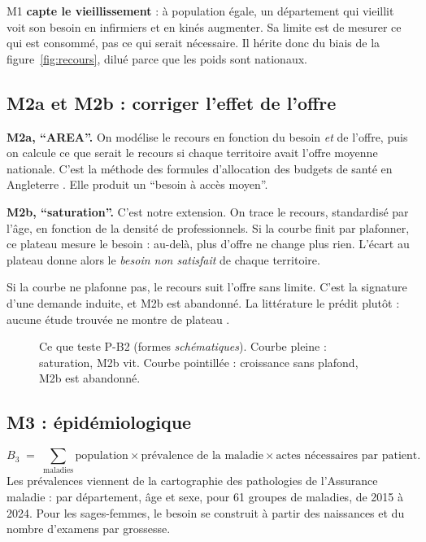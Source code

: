\documentclass[11pt]{article}
\begin{document}
M1 \textbf{capte le vieillissement} : à population égale, un département qui vieillit voit son besoin en infirmiers et
en kinés augmenter. Sa limite est de mesurer ce qui est consommé, pas ce qui serait nécessaire. Il hérite donc du
biais de la figure~\ref{fig:recours}, dilué parce que les poids sont nationaux.

\subsection*{M2a et M2b : corriger l'effet de l'offre}
\textbf{M2a, \enquote{AREA}.} On modélise le recours en fonction du besoin \emph{et} de l'offre, puis on calcule ce
que serait le recours si chaque territoire avait l'offre moyenne nationale. C'est la méthode des formules d'allocation
des budgets de santé en Angleterre \citep{gravelle2003}. Elle produit un \enquote{besoin à accès moyen}.

\textbf{M2b, \enquote{saturation}.} C'est notre extension. On trace le recours, standardisé par l'âge, en fonction de
la densité de professionnels. Si la courbe finit par plafonner, ce plateau mesure le besoin : au-delà, plus d'offre ne
change plus rien. L'écart au plateau donne alors le \emph{besoin non satisfait} de chaque territoire.

Si la courbe ne plafonne pas, le recours suit l'offre sans limite. C'est la signature d'une demande induite, et M2b
est abandonné. La littérature le prédit plutôt : aucune étude trouvée ne montre de plateau \citep{delattre2003}.

\begin{figure}[h]
\centering
{}
\caption{Ce que teste P-B2 (formes \emph{schématiques}). Courbe pleine : saturation, M2b vit. Courbe pointillée :
croissance sans plafond, M2b est abandonné.}
\end{figure}

\subsection*{M3 : épidémiologique}
\[
B_3 \;=\; \sum_{\text{maladies}} \text{population} \times \text{prévalence de la maladie} \times
\text{actes nécessaires par patient}.
\]
Les prévalences viennent de la cartographie des pathologies de l'Assurance maladie : par département, âge et sexe,
pour 61\mesure{} groupes de maladies, de 2015 à 2024\mesure{}. Pour les sages-femmes, le besoin se construit à partir
des naissances et du nombre d'examens par grossesse.
\end{document}
